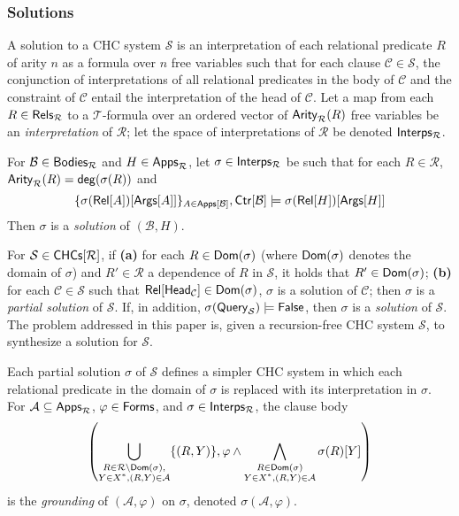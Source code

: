 \subsubsection{Solutions}
\label{sec:chc-solns}
%
A solution to a CHC system $\mathcal{S}$ is an interpretation of each
relational predicate $R$ of arity $n$ as a formula over $n$ free
variables such that for each clause $\mathcal{C} \in \mathcal{S}$, the
conjunction of interpretations of all relational predicates in the
body of $\mathcal{C}$ and the constraint of $\mathcal{C}$ entail the
interpretation of the head of $\mathcal{C}$.
%
Let a map from each $R \in \mathsf{Rels}_{ \mathcal{R} }$ to a
$\mathcal{T}$-formula over an ordered vector of $\mathsf{Arity}_{ \mathcal{R}
}(R)$ free variables be an \emph{interpretation} of $\mathcal{R}$;
%
let the space of interpretations of $\mathcal{R}$ be denoted
$\mathsf{Interps_{  \mathcal{R}  }}$.
%
\begin{defn}
  \label{defn:chc-soln}
  For $\mathcal{B} \in \mathsf{Bodies}_{ \mathcal{R} }$ and $H \in \mathsf{Apps}_{
    \mathcal{R} }$, %
  let $\sigma \in \mathsf{Interps_{  \mathcal{R}  }}$ be such that for each $R
  \in \mathcal{R}$, $\mathsf{Arity}_{\mathcal{R}}(R) = \mathsf{deg}(\sigma(R))$
  and %
  \[ \elts{ \sigma(\relof{ A })[ \argsof{ A } ] }_{ A \in \appsof{
      \mathcal{B} } }, %
  \ctrof{ \mathcal{B} } \entails %
  \sigma( \relof{H} )[ \argsof{ H } ]
  \]
  Then $\sigma$ is a \emph{solution} of $(\mathcal{B}, H)$.
\end{defn}
For $\mathcal{S} \in \mathsf{CHCs}[  \mathcal{R}  ]$, if
\textbf{(a)} for each $R \in \mathsf{Dom}(\sigma)$ (where $\mathsf{Dom}(\sigma)$
denotes the domain of $\sigma$) and $R' \in \mathcal{R}$ a dependence
of $R$ in $\mathcal{S}$, it holds that $R' \in \mathsf{Dom}(\sigma)$;
%
\textbf{(b)} for each $\mathcal{C} \in \mathcal{S}$ such that
$\mathsf{Rel}[  \mathsf{Head}_{ \mathcal{C} }  ] \in \mathsf{Dom}(\sigma)$, $\sigma$ is a
solution of $\mathcal{C}$;
%
then $\sigma$ is a \emph{partial solution} of $\mathcal{S}$.
%
If, in addition, $\sigma(\mathsf{Query}_{ \mathcal{S} }) \models \mathsf{False}$,
then $\sigma$ is a \emph{solution} of $\mathcal{S}$.
%
The problem addressed in this paper is, given a recursion-free CHC
system $\mathcal{S}$, to synthesize a solution for $\mathcal{S}$.

Each partial solution $\sigma$ of $\mathcal{S}$ defines a simpler CHC
system in which each relational predicate in the domain of $\sigma$ is
replaced with its interpretation in $\sigma$.
%
For $\mathcal{A} \subseteq \mathsf{Apps}_{\mathcal{R}}$, $\varphi \in
\mathsf{Forms}$, and $\sigma \in \mathsf{Interps_{  \mathcal{R}  }}$, the clause body
\begin{align*}
  \left( \bigunion_{ \substack{ %
      R \in \mathcal{R} \setminus \domain(\sigma), \\
      Y \in X^{*}, 
      (R, Y) \in \mathcal{A} } } \elts{(R, Y)}, 
  \varphi \land %
  \bigland_{ \substack{ R \in \domain(\sigma) \\ 
      Y \in X^{*},
      (R, Y) \in \mathcal{A} } } \sigma(R)[ Y ] \right)
\end{align*}
%
is the \emph{grounding} of $(\mathcal{A}, \varphi)$ on $\sigma$,
denoted $\sigma(\mathcal{A}, \varphi)$.

